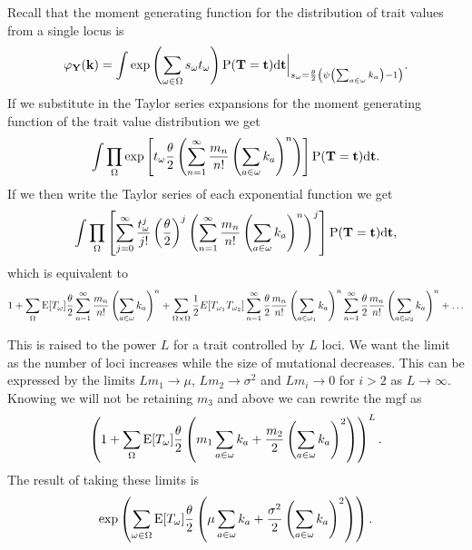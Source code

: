 Recall that the moment generating function for the distribution of trait values
from a single locus is
\begin{equation*}
  \varphi_{\mathbf{Y}}(\mathbf{k}) = \int \exp \left( \sum_{\omega \in \Omega} s_{\omega}t_{\omega} \right)
  \mathrm{P}(\mathbf{T}=\mathbf{t})\mathrm{d}\mathbf{t}
  \Bigr|_{s_{\omega}=\frac{\theta}{2} \left( \psi\left(\sum_{a \in \omega}k_{a}\right) -1 \right)}.
\end{equation*}
If we substitute in the Taylor series expansions for the moment generating
function of the trait value distribution we get
\begin{equation*}
  \int \prod_{\Omega} \exp\left[ t_{\omega} \frac{\theta}{2} \left( \sum_{n=1}^{\infty} \frac{m_n}{n!}
    \left( \sum_{a \in \omega} k_a \right)^n \right) \right]
  \mathrm{P}(\mathbf{T} = \mathbf{t}) \mathrm{d}\mathbf{t}.
\end{equation*}
If we then write the Taylor series of each exponential function we get
\begin{equation*}
  \int \prod_{\Omega} \left[ \sum_{j=0}^\infty \frac{t_{\omega}^j}{j!}
  \left( \frac{\theta}{2} \right)^j \left( \sum_{n=1}^{\infty} \frac{m_n}{n!}
  \left( \sum_{a \in \omega} k_a \right)^n \right)^j \right]
  \mathrm{P}(\mathbf{T} = \mathbf{t}) \mathrm{d}\mathbf{t},
\end{equation*}
which is equivalent to
\begin{equation*}
  1 + \sum_{\Omega} \mathrm{E}[T_\omega] \frac{\theta}{2} \sum_{n=1}^{\infty} \frac{m_n}{n!} \left(
  \sum_{a \in \omega} k_a \right)^n +
  \sum_{\Omega \times \Omega} \frac{1}{2} E[T_{\omega_1}T_{\omega_2}]
  \sum_{n=1}^{\infty} \frac{\theta}{2} \frac{m_n}{n!} \left(\sum_{a \in \omega_1} k_a \right)^n
  \sum_{n=1}^{\infty} \frac{\theta}{2} \frac{m_n}{n!} \left(\sum_{a \in \omega_2} k_a \right)^n + \ldots
\end{equation*}

This is raised to the power $L$ for a trait controlled by $L$ loci. We want the
limit as the number of loci increases while the size of mutational decreases.
This can be expressed by the limits $L m_1 \to \mu$, $L m_2\to \sigma^2$ and $L
m_i\to 0$ for $i>2$ as $L \to \infty$. Knowing we will not be retaining $m_3$
and above we can rewrite the mgf as
\begin{equation*}
  \left(1 + \sum_{\Omega} \mathrm{E}[T_\omega] \frac{\theta}{2} \left(m_1 \sum_{a \in \omega} k_a +
  \frac{m_2}{2} \left(\sum_{a \in \omega} k_a \right)^2\right)\right)^L.
\end{equation*}
The result of taking these limits is
\begin{equation}
  \label{eq:norm_mgf}
  \exp \left( \sum_{\omega \in \Omega}\mathrm{E}[T_{\omega}] \frac{\theta}{2} \left( \mu 
  \sum_{a \in \omega} k_a + \frac{\sigma^2}{2}\left( \sum_{a \in \omega}
  k_a\right)^2\right)\right).
\end{equation}

